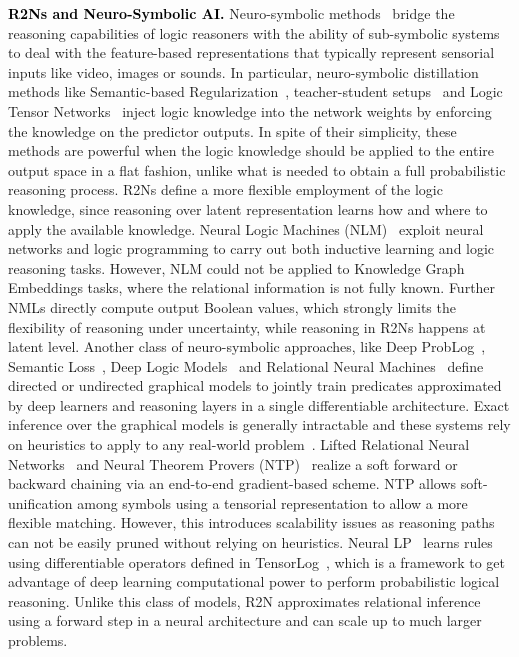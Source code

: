 \documentclass[journal]{IEEEtran}
\newcommand{\ar}[1]{\textcolor{black}{#1}}
\begin{document}
\ar{{\bf R2Ns and Neuro-Symbolic AI. }} Neuro-symbolic methods~\cite{de2020statistical} bridge the reasoning capabilities of logic reasoners with the ability of sub-symbolic systems to deal with the feature-based representations that typically represent sensorial inputs like video, images or sounds.
In particular, neuro-symbolic distillation methods like Semantic-based Regularization~\cite{diligenti2017semantic}, teacher-student setups~\cite{hu2016harnessing} and Logic Tensor Networks~\cite{donadello2017logic} inject logic knowledge into the network weights by enforcing the knowledge on the predictor outputs.
In spite of their simplicity, these methods are powerful when the logic knowledge should be applied to the entire output space in a flat fashion, unlike what is needed to obtain a full probabilistic reasoning process.
R2Ns define a more flexible employment of the logic knowledge, since reasoning over latent representation learns how and where to apply the available knowledge.
Neural Logic Machines (NLM)~\cite{dong2018neural} exploit neural networks and logic programming to carry out both inductive learning and logic reasoning tasks. However, NLM could not be applied to Knowledge Graph Embeddings tasks, where the relational information is not fully known. Further NMLs directly compute output Boolean values, which strongly limits the flexibility of reasoning under uncertainty, while reasoning in R2Ns happens at latent level.
%
Another class of neuro-symbolic approaches, like Deep ProbLog~\cite{manhaeve2018deepproblog},
Semantic Loss~\cite{xu2017semantic}, 
Deep Logic Models~\cite{marra2019integrating} and Relational Neural Machines~\cite{marra2020rnm} define directed or undirected graphical models to jointly train predicates approximated by deep learners and reasoning layers in a single differentiable architecture.
Exact inference over the graphical models is generally intractable and these systems rely on heuristics to apply to any real-world problem~\cite{marra2020inference,manhaeve2021approximate}.
Lifted Relational Neural Networks~\cite{sourek2018lifted} and Neural Theorem Provers (NTP)~\cite{rocktaschel2017end,minervini2018towards,minervini2020learning}
realize a soft forward or backward chaining via an end-to-end gradient-based scheme. NTP allows soft-unification among symbols using a tensorial representation to allow a more flexible matching. However, this introduces scalability issues as reasoning paths can not be easily pruned without relying on heuristics. 
Neural LP~\cite{yang2017differentiable} learns rules using differentiable operators defined in TensorLog~\cite{cohen2020tensorlog}, which is a framework to get advantage of deep learning computational power to perform probabilistic logical reasoning.
Unlike this class of models, R2N approximates relational inference using a forward step in a neural architecture and can scale up to much larger problems.
\end{document}
